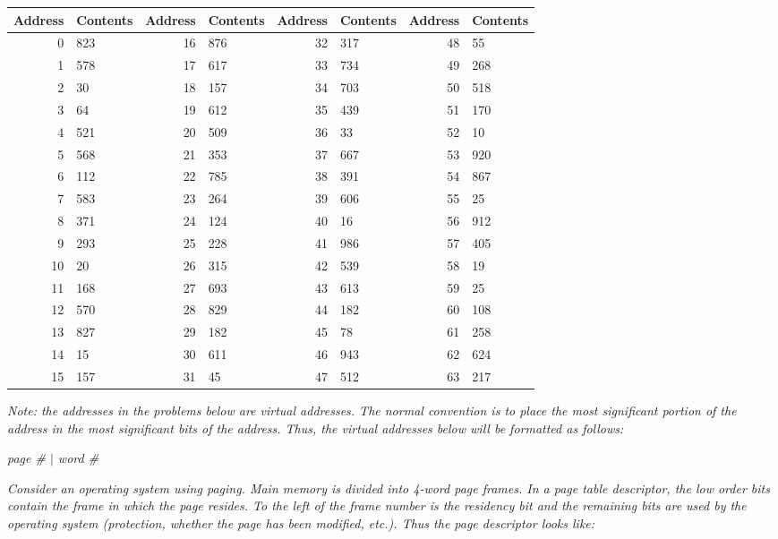 \documentclass[letterpaper,11pt]{article}
\begin{document}
\begin{enumerate}
\begin{center}
  \begin{tabular}{r | l | r | l | r | l | r | l}
Address & Contents & Address & Contents & Address & Contents & Address & Contents \\ \hline
    \hline
0 & 823  & 16 & 876 & 32 & 317 & 48 & 55 \\ \hline
1 & 578  & 17 & 617 & 33 & 734 & 49 & 268 \\ \hline
2 & 30   & 18 & 157 & 34 & 703 & 50 & 518 \\ \hline
3 & 64   & 19 & 612 & 35 & 439 & 51 & 170 \\ \hline
4 & 521  & 20 & 509 & 36 & 33  & 52 & 10 \\ \hline
5 & 568  & 21 & 353 & 37 & 667 & 53 & 920 \\ \hline
6 & 112  & 22 & 785 & 38 & 391 & 54 & 867 \\ \hline
7 & 583  & 23 & 264 & 39 & 606 & 55 & 25 \\ \hline
8 & 371  & 24 & 124 & 40 & 16  & 56 & 912 \\ \hline
9 & 293  & 25 & 228 & 41 & 986 & 57 & 405 \\ \hline
10 & 20  & 26 & 315 & 42 & 539 & 58 & 19 \\ \hline
11 & 168 & 27 & 693 & 43 & 613 & 59 & 25 \\ \hline
12 & 570 & 28 & 829 & 44 & 182 & 60 & 108 \\ \hline
13 & 827 & 29 & 182 & 45 & 78  & 61 & 258 \\ \hline
14 & 15  & 30 & 611 & 46 & 943 & 62 & 624 \\ \hline
15 & 157 & 31 & 45  & 47 & 512 & 63 & 217 \\ \hline
  \end{tabular}
\end{center}
\emph{Note: the addresses in the problems below are virtual addresses. The normal convention is to place the most significant portion of the address in the most significant bits of the address. Thus, the virtual addresses below will be formatted as follows:}

\emph{page \# $|$ word \#}

\emph{Consider an operating system using paging. Main memory is divided into 4-word page frames. In a page table descriptor, the low order bits contain the frame in which the page resides. To the left of the frame number is the residency bit and the remaining bits are used by the operating system (protection, whether the page has been modified, etc.). Thus the page descriptor looks like:}


\end{enumerate}
\end{document}
